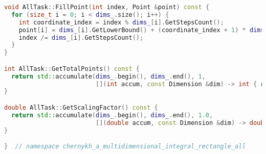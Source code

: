 \documentclass[a4paper,12pt]{article}
\begin{document}
\begin{lstlisting}[language=C++,label={lst:mpi+openmp}]
void AllTask::FillPoint(int index, Point &point) const {
  for (size_t i = 0; i < dims_.size(); i++) {
    int coordinate_index = index % dims_[i].GetStepsCount();
    point[i] = dims_[i].GetLowerBound() + (coordinate_index + 1) * dims_[i].GetStepSize();
    index /= dims_[i].GetStepsCount();
  }
}

int AllTask::GetTotalPoints() const {
  return std::accumulate(dims_.begin(), dims_.end(), 1,
                         [](int accum, const Dimension &dim) -> int { return accum * dim.GetStepsCount(); });
}

double AllTask::GetScalingFactor() const {
  return std::accumulate(dims_.begin(), dims_.end(), 1.0,
                         [](double accum, const Dimension &dim) -> double { return accum * dim.GetStepSize(); });
}

}  // namespace chernykh_a_multidimensional_integral_rectangle_all
  \end{lstlisting}
\end{document}
